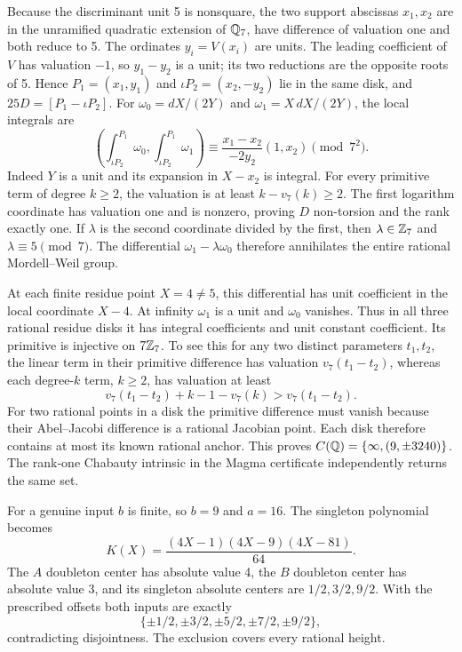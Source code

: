 Because the discriminant unit 5 is nonsquare, the two support
abscissas $x_1,x_2$ are in the unramified quadratic extension of
$\mathbb Q_7$, have difference of valuation one and both reduce
to 5. The ordinates $y_i=V(x_i)$ are units. The leading coefficient
of $V$ has valuation $-1$, so $y_1-y_2$ is a unit; its two reductions
are the opposite roots of 5. Hence $P_1=(x_1,y_1)$ and
$\iota P_2=(x_2,-y_2)$ lie in the same disk, and
$25D=[P_1-\iota P_2]$. For
$\omega_0=dX/(2Y)$ and $\omega_1=X\,dX/(2Y)$, the local integrals are
\[
 \left(\int_{\iota P_2}^{P_1}\omega_0,
       \int_{\iota P_2}^{P_1}\omega_1\right)
 \equiv\frac{x_1-x_2}{-2y_2}(1,x_2)\pmod{7^2}.
\]
Indeed $Y$ is a unit and its expansion in $X-x_2$ is integral.
For every primitive term of degree $k\geq2$, the valuation is at
least $k-v_7(k)\geq2$. The first logarithm coordinate has valuation
one and is nonzero, proving $D$ non-torsion and the rank exactly one.
If $\lambda$ is the second coordinate divided by the first, then
$\lambda\in\mathbb Z_7$ and $\lambda\equiv5\pmod7$.
The differential $\omega_1-\lambda\omega_0$ therefore annihilates
the entire rational Mordell--Weil group.

At each finite residue point $X=4\ne5$, this differential has unit
coefficient in the local coordinate $X-4$. At infinity $\omega_1$
is a unit and $\omega_0$ vanishes. Thus in all three rational residue
disks it has integral coefficients and unit constant coefficient.
Its primitive is injective on $7\mathbb Z_7$. To see this for any
two distinct parameters $t_1,t_2$, the linear term in their primitive
difference has valuation $v_7(t_1-t_2)$, whereas each degree-$k$
term, $k\geq2$, has valuation at least
\[
 v_7(t_1-t_2)+k-1-v_7(k)>v_7(t_1-t_2).
\]
For two rational points in a disk the primitive difference must vanish
because their Abel--Jacobi difference is a rational Jacobian point.
Each disk therefore contains at most its known rational anchor.
This proves $C(\mathbb Q)=\{\infty,(9,\pm3240)\}$.
The rank-one Chabauty intrinsic in the Magma certificate independently
returns the same set.

For a genuine input $b$ is finite, so $b=9$ and $a=16$. The
singleton polynomial becomes
\[
 K(X)=\frac{(4X-1)(4X-9)(4X-81)}{64}.
\]
The $A$ doubleton center has absolute value 4, the $B$ doubleton
center has absolute value 3, and its singleton absolute centers are
$1/2,3/2,9/2$. With the prescribed offsets both inputs are exactly
\[
 \{\pm1/2,\pm3/2,\pm5/2,\pm7/2,\pm9/2\},
\]
contradicting disjointness. The exclusion covers every rational height.
